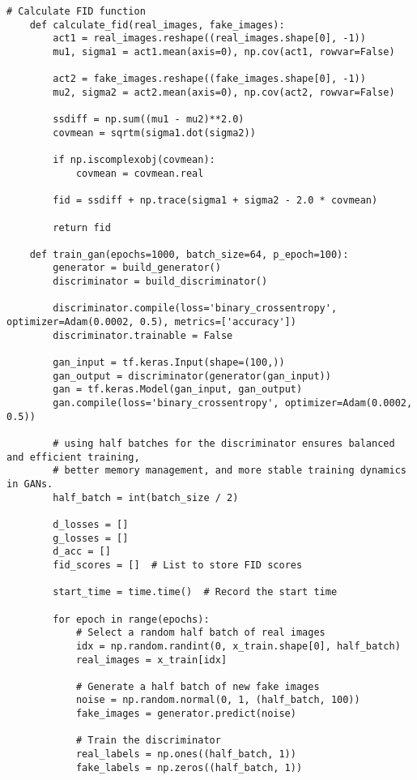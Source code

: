 \begin{lstlisting}[style=mypython, caption=GAN Model with Convolutional Layers]
    # Calculate FID function
    def calculate_fid(real_images, fake_images):
        act1 = real_images.reshape((real_images.shape[0], -1))
        mu1, sigma1 = act1.mean(axis=0), np.cov(act1, rowvar=False)
        
        act2 = fake_images.reshape((fake_images.shape[0], -1))
        mu2, sigma2 = act2.mean(axis=0), np.cov(act2, rowvar=False)
        
        ssdiff = np.sum((mu1 - mu2)**2.0)
        covmean = sqrtm(sigma1.dot(sigma2))
        
        if np.iscomplexobj(covmean):
            covmean = covmean.real
        
        fid = ssdiff + np.trace(sigma1 + sigma2 - 2.0 * covmean)
        
        return fid
    
    def train_gan(epochs=1000, batch_size=64, p_epoch=100):
        generator = build_generator()
        discriminator = build_discriminator()
    
        discriminator.compile(loss='binary_crossentropy', optimizer=Adam(0.0002, 0.5), metrics=['accuracy'])
        discriminator.trainable = False
    
        gan_input = tf.keras.Input(shape=(100,))
        gan_output = discriminator(generator(gan_input))
        gan = tf.keras.Model(gan_input, gan_output)
        gan.compile(loss='binary_crossentropy', optimizer=Adam(0.0002, 0.5))
    
        # using half batches for the discriminator ensures balanced and efficient training, 
        # better memory management, and more stable training dynamics in GANs.
        half_batch = int(batch_size / 2)
        
        d_losses = []
        g_losses = []
        d_acc = []
        fid_scores = []  # List to store FID scores
        
        start_time = time.time()  # Record the start time
    
        for epoch in range(epochs):
            # Select a random half batch of real images
            idx = np.random.randint(0, x_train.shape[0], half_batch)
            real_images = x_train[idx]
    
            # Generate a half batch of new fake images
            noise = np.random.normal(0, 1, (half_batch, 100))
            fake_images = generator.predict(noise)
    
            # Train the discriminator
            real_labels = np.ones((half_batch, 1))
            fake_labels = np.zeros((half_batch, 1))
    

\end{lstlisting}
